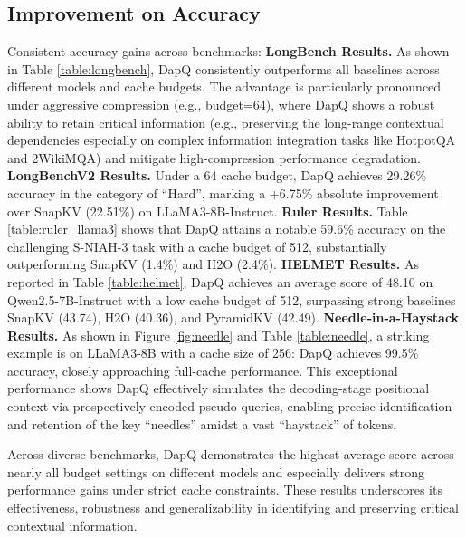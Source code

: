 % 
% 
% 

\subsection{Improvement on Accuracy}
Consistent accuracy gains across benchmarks:
\textbf{LongBench Results.} As shown in Table \ref{table:longbench}, DapQ consistently outperforms all baselines across different models and cache budgets. The advantage is particularly pronounced under aggressive compression (e.g., budget=64), where DapQ shows a robust ability to retain critical information (e.g., preserving the long-range contextual dependencies especially on complex information integration tasks like HotpotQA and 2WikiMQA) and mitigate high-compression performance degradation. 
\textbf{LongBenchV2 Results.}
Under a 64 cache budget, DapQ achieves 29.26\% accuracy in the category of \enquote{Hard}, marking a +6.75\% absolute improvement over SnapKV (22.51\%) on LLaMA3-8B-Instruct.
\textbf{Ruler Results.}
Table \ref{table:ruler_llama3} shows that DapQ attains a notable 59.6\% accuracy on the challenging S-NIAH-3 task with a cache budget of 512, substantially outperforming SnapKV (1.4\%) and H2O (2.4\%). 
\textbf{HELMET Results.}
As reported in Table \ref{table:helmet}, DapQ achieves an average score of 48.10 on Qwen2.5-7B-Instruct with a low cache budget of 512, surpassing strong baselines SnapKV (43.74), H2O (40.36), and PyramidKV (42.49). 
\textbf{Needle-in-a-Haystack Results.}
As shown in Figure \ref{fig:needle} and Table \ref{table:needle}, a striking example is on LLaMA3-8B with a cache size of 256: DapQ achieves 99.5\% accuracy, closely approaching full-cache performance. This exceptional performance shows DapQ effectively simulates the decoding-stage positional context via prospectively encoded pseudo queries, enabling precise identification and retention of the key “needles” amidst a vast “haystack” of tokens.


Across diverse benchmarks, DapQ demonstrates the highest average score across nearly all budget settings on different models and especially delivers strong performance gains under strict cache constraints. These results underscores its effectiveness, robustness and generalizability in identifying and preserving critical contextual information. 






